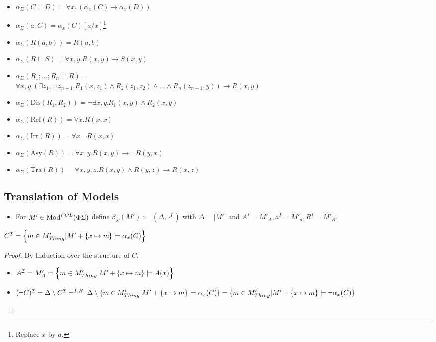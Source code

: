 \documentclass[10pt,%
\ifpretendfinal
final%
\else
draft%
\fi,
]{scrreprt}
\newcommand{\ssclause}[1]{\subsection{#1}}
\begin{document}
\begin{itemize}
 \item $\alpha_\Sigma (C \sqsubseteq D) = \forall x.\, (\alpha_x(C) \rightarrow \alpha_x(D))$
 \item $\alpha_\Sigma (a:C) = \alpha_x(C)[a/x]$\footnote{Replace $x$ by $a$.}
 \item $\alpha_\Sigma (R(a,b)) = R(a,b)$
 \item $\alpha_\Sigma (R \sqsubseteq S) = \forall x, y. R(x,y) \rightarrow S(x,y) $
 \item $\alpha_\Sigma (R_1; \ldots; R_n \sqsubseteq R) =$\\
$ \forall x,y . (\exists z_1,\ldots z_{n-1} . R_1(x,z_1) \wedge R_2(z_1,z_2) \wedge \ldots \wedge R_n(z_{n-1},y)) \rightarrow R(x,y) $
 \item $\alpha_\Sigma (\text{Dis}(R_1,R_2)) = \neg\exists x,y . R_1(x,y)\wedge R_2(x,y)$	
 \item $\alpha_\Sigma (\text{Ref}(R)) = \forall x. R(x,x)$
 \item $\alpha_\Sigma (\text{Irr}(R)) = \forall x. \neg R(x,x)$
 \item $\alpha_\Sigma (\text{Asy}(R)) = \forall x,y . R(x,y) \rightarrow \neg R(y,x)$
 \item $\alpha_\Sigma (\text{Tra}(R)) = \forall x,y,z . R(x,y) \wedge R(y,z) \rightarrow R(x,z)$
\end{itemize}





\ssclause{Translation of Models}

\begin{itemize}
	\item For $M' \in \text{Mod}^{FOL}(\Phi \Sigma)$ define $\beta_\Sigma(M') := (\Delta, \cdot^I)$
	with $\Delta = |M'|$ and $A^I = M'_A, a^I = M'_a, R^I = M'_R$.
\end{itemize}

	\begin{proposition}
$C^{\mathcal{I}} = \left\{m \in M'_{{Thing} } \lvert M' + \{x \mapsto m \} \models \alpha_x (C) \right\}$
	\end{proposition}
	
	\begin{proof} By Induction over the structure of $C$.
\begin{itemize}
	\item $A^{\mathcal{I}} = M'_A = \left \{m \in M'_{{Thing} } \vert M' + \{x \mapsto m \} \models A(x)  \right\}$
	\item $(\lnot C)^{\mathcal{I}} = \Delta \setminus C^{\mathcal{I}} =^{I.H.} \Delta \setminus \{m \in M'_{Thing}  \lvert M' + \{x \mapsto m\} \models \alpha_x(C)\} = \{m \in M'_{Thing}  \vert M' + \{x \mapsto m\} \models \lnot \alpha_x(C)\}$
\end{itemize}
	\end{proof}
\end{document}
